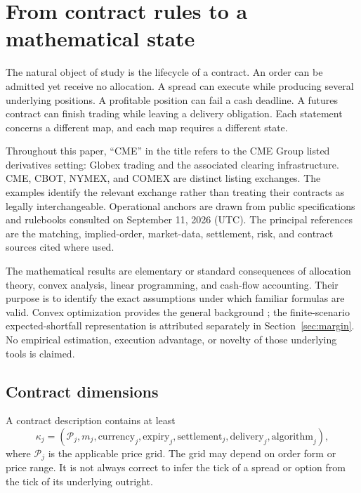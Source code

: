 \section{From contract rules to a mathematical state}
\label{sec:foundations}

The natural object of study is the lifecycle of a contract. An order can be admitted yet receive no allocation. A spread can execute while producing several underlying positions. A profitable position can fail a cash deadline. A futures contract can finish trading while leaving a delivery obligation. Each statement concerns a different map, and each map requires a different state.

Throughout this paper, ``CME'' in the title refers to the CME Group listed derivatives setting: Globex trading and the associated clearing infrastructure. CME, CBOT, NYMEX, and COMEX are distinct listing exchanges. The examples identify the relevant exchange rather than treating their contracts as legally interchangeable. Operational anchors are drawn from public specifications and rulebooks consulted on September 11, 2026 (UTC). The principal references are the matching, implied-order, market-data, settlement, risk, and contract sources cited where used.

The mathematical results are elementary or standard consequences of allocation theory, convex analysis, linear programming, and cash-flow accounting. Their purpose is to identify the exact assumptions under which familiar formulas are valid. Convex optimization provides the general background \citep{Boyd2004}; the finite-scenario expected-shortfall representation is attributed separately in Section~\ref{sec:margin}. No empirical estimation, execution advantage, or novelty of those underlying tools is claimed.

\subsection{Contract dimensions}

A contract description contains at least
\begin{equation}
 \kappa_j=(\mathcal P_j,m_j,\text{currency}_j,\text{expiry}_j,
 \text{settlement}_j,\text{delivery}_j,\text{algorithm}_j),
\end{equation}
where $\mathcal P_j$ is the applicable price grid. The grid may depend on order form or price range. It is not always correct to infer the tick of a spread or option from the tick of its underlying outright.

